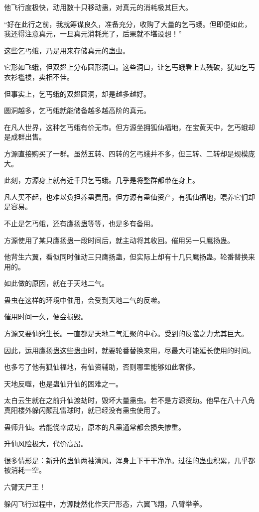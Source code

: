 \begin{this_body}
他飞行度极快，动用数十只移动蛊，对真元的消耗极其巨大。

“好在此行之前，我就筹谋良久，准备充分，收购了大量的乞丐蛾。但即便如此，我还得注意真元，一旦真元消耗光了，后果就不堪设想！”

这些乞丐蛾，乃是用来存储真元的蛊虫。

它形如飞蛾，但双翅上分布圆形洞口。这些洞口，让乞丐蛾看上去残破，犹如乞丐衣衫褴褛，卖相不佳。

但事实上，乞丐蛾的双翅圆洞，却是越多越好。

圆洞越多，乞丐蛾就能储备越多越高阶的真元。

在凡人世界，这种乞丐蛾有价无市。但方源坐拥狐仙福地，在宝黄天中，乞丐蛾却是成群出售。

方源直接购买了一群。虽然五转、四转的乞丐蛾并不多，但三转、二转却是规模庞大。

此刻，方源身上就有近千只乞丐蛾。几乎是将整群都带在身上。

凡人买不起，也难以负担养蛊费用。但方源有蛊仙资产，有狐仙福地，喂养它们却是容易。

不止是乞丐蛾，还有鹰扬蛊等等，也是多有备用。

方源使用了某只鹰扬蛊一段时间后，就主动将其收回。催用另一只鹰扬蛊。

他背生六翼，看似同时催动三只鹰扬蛊，但实际上却有十几只鹰扬蛊。轮番替换来用的。

如此做的原因，就在于天地二气。

蛊虫在这样的环境中催用，会受到天地二气的反噬。

催用时间一久，便会损毁。

方源又要仙窍生长。一直都是天地二气汇聚的中心。受到的反噬之力尤其巨大。

因此，运用鹰扬蛊这些蛊虫时，就要轮番替换来用，尽最大可能延长使用的时间。

也多亏了他有狐仙福地，有仙资辅助，否则哪里能够如此奢侈。

天地反噬，也是蛊仙升仙的困难之一。

太白云生就在之前升仙渡劫时，毁坏大量蛊虫。若不是方源资助。他早在八十八角真阳楼外躲闪颠乱雷球时，就已经没有蛊虫使用了。

蛊师升仙。若能侥幸成功，原本的凡蛊通常都会损失惨重。

升仙风险极大，代价高昂。

很多情形是：新升的蛊仙两袖清风，浑身上下干干净净。过往的蛊虫积累，几乎都被消耗一空。

六臂天尸王！

躲闪飞行过程中，方源陡然化作天尸形态，六翼飞翔，八臂举拳。


\end{this_body}
